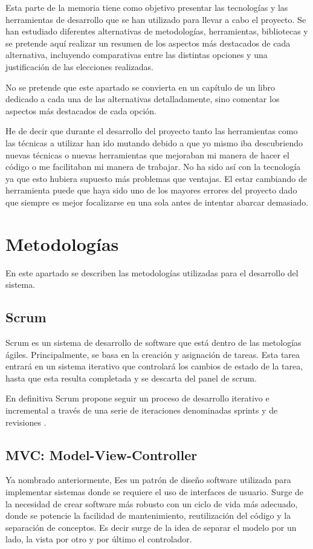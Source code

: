 
Esta parte de la memoria tiene como objetivo presentar las tecnologías y las herramientas de desarrollo que se han utilizado para llevar a cabo el proyecto. Se han estudiado diferentes alternativas de metodologías, herramientas, bibliotecas  y se pretende aquí realizar un resumen de los aspectos más destacados de cada alternativa, incluyendo comparativas entre las distintas opciones y una justificación de las elecciones realizadas. 

No se pretende que este apartado se convierta en un capítulo de un libro dedicado a cada una de las alternativas detalladamente, sino comentar los aspectos más destacados de cada opción.

He de decir que durante el desarrollo del proyecto tanto las herramientas como las técnicas a utilizar han ido mutando debido a que yo mismo iba descubriendo nuevas técnicas o nuevas herramientas que mejoraban mi manera de hacer el código o me facilitaban mi manera de trabajar. No ha sido así con la tecnología ya que esto hubiera supuesto más problemas que ventajas. El estar cambiando de herramienta puede que haya sido uno de los mayores errores del proyecto dado que siempre es mejor focalizarse en una sola antes de intentar abarcar demasiado. 


\section{Metodologías}\label{metodologias}
En este apartado se describen las metodologías utilizadas para el desarrollo del sistema.

\subsection{Scrum}\label{scrum}
Scrum es un sistema de desarrollo de software que está dentro de las metologías ágiles. Principalmente, se basa en la creación y asignación de tareas. Esta tarea entrará en un sistema iterativo que controlará los cambios de estado de la tarea, hasta que esta resulta completada y se descarta del panel de scrum.

En definitiva Scrum propone seguir un proceso de desarrollo iterativo e incremental a través de una serie de iteraciones denominadas sprints y de revisiones \cite{scrumquees}.


\subsection{MVC: Model-View-Controller}\label{mvc}
Ya nombrado anteriormente, Ees un patrón de diseño software utilizada para implementar sistemas donde se requiere el uso de interfaces de usuario. Surge de la necesidad de crear software más robusto con un ciclo de vida más adecuado, donde se potencie la facilidad de mantenimiento, reutilización del código y la separación de conceptos. Es decir surge de la idea de separar el modelo por un lado, la vista por otro y por último el controlador.


